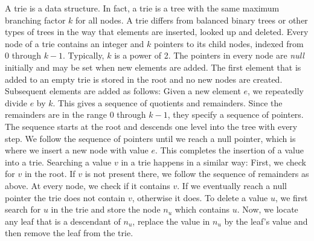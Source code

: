 A trie \cite{knuth:tries} is a data structure.
In fact, a trie is a tree with the same maximum branching factor $k$ for all nodes.
A trie differs from balanced binary trees or other types of trees in the way that elements are inserted, looked up and deleted.
Every node of a trie contains an integer and $k$ pointers to its child nodes, indexed from 0 through $k - 1$.
Typically, $k$ is a power of 2.
The pointers in every node are \emph{null} initially and may be set when new elements are added.
The first element that is added to an empty trie is stored in the root and no new nodes are created.
Subsequent elements are added as follows:
Given a new element $e$, we repeatedly divide $e$ by $k$.
This gives a sequence of quotients and remainders.
Since the remainders are in the range 0 through $k - 1$, they specify a sequence of pointers.
The sequence starts at the root and descends one level into the tree with every step.
We follow the sequence of pointers until we reach a null pointer, which is where we insert a new node with value $e$.
This completes the insertion of a value into a trie.
Searching a value $v$ in a trie happens in a similar way:
First, we check for $v$ in the root.
If $v$ is not present there, we follow the sequence of remainders as above.
At every node, we check if it contains $v$.
If we eventually reach a null pointer the trie does not contain $v$, otherwise it does.
To delete a value $u$, we first search for $u$ in the trie and store the node $n_u$ which contains $u$.
Now, we locate any leaf that is a descendant of $n_u$, replace the value in $n_u$ by the leaf's value and then remove the leaf from the trie.
